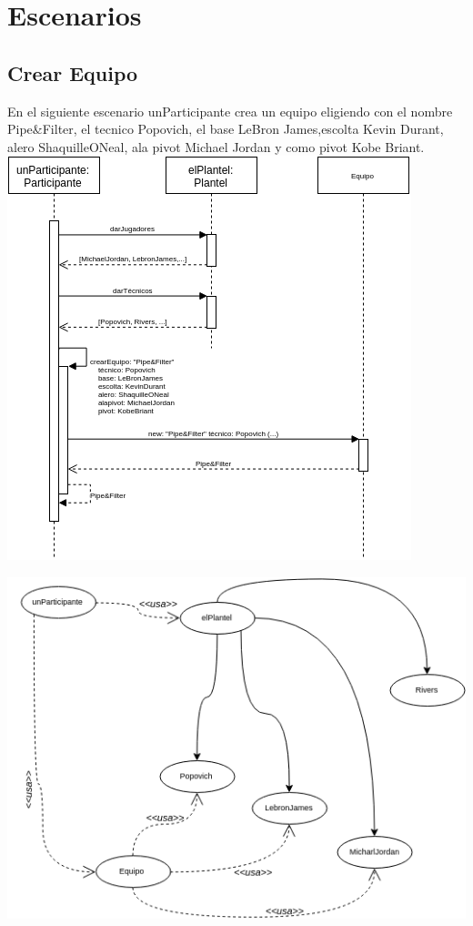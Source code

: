 \section{Escenarios}

\subsection{Crear Equipo}

En el siguiente escenario unParticipante crea un equipo eligiendo con el nombre Pipe\&Filter, el tecnico Popovich, el base LeBron James,escolta Kevin Durant, alero ShaquilleONeal, ala pivot Michael Jordan y como pivot Kobe Briant. 
\includegraphics[width=\textwidth]{imgs/crearEquipoSecuencia.png}

\includegraphics[width=\textwidth]{imgs/crearEquipoObjetos.png}



